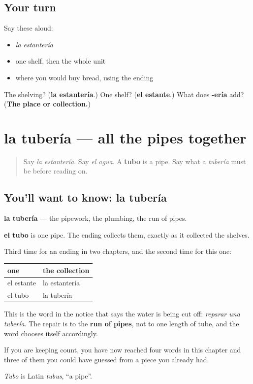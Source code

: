 \subsection*{Your turn}
Say these aloud:

\begin{itemize}
\raggedright
  \item \emph{la estantería}
  \item one shelf, then the whole unit
  \item where you would buy bread, using the ending
\end{itemize}

\begin{tcolorbox}[breakable,colback=teal!4,colframe=teal!35!black,title={Before you move on}]
The shelving? (\textbf{la estantería}.) One shelf? (\textbf{el estante}.) What does \textbf{-ería} add? (\textbf{The place or collection.})
\end{tcolorbox}
\section[la tubería]{la tubería — all the pipes together}

\label{lesson:ES-C432-tuberia}



\begin{quote}
Say \emph{la estantería}. Say \emph{el agua}. A \textbf{tubo} is a pipe. Say what a \emph{tubería} must be before reading on.
\end{quote}

\subsection*{You'll want to know: la tubería}
\textbf{la tubería} — the pipework, the plumbing, the run of pipes.

\textbf{el tubo} is one pipe. The ending collects them, exactly as it collected the shelves.

\begin{cousinweb}
Third time for an ending in two chapters, and the second time for this one:

\noindent
\begin{tabularx}{\linewidth}{@{}>{\raggedright\arraybackslash}X>{\raggedright\arraybackslash}X@{}}
\toprule
\textbf{one} & \textbf{the collection} \\
\midrule
el estante & la estantería \\
el tubo & la tubería \\
\bottomrule
\end{tabularx}

This is the word in the notice that says the water is being cut off: \emph{reparar una tubería}. The repair is to the \textbf{run of pipes}, not to one length of tube, and the word chooses itself accordingly.

If you are keeping count, you have now reached four words in this chapter and three of them you could have guessed from a piece you already had.

\emph{Tubo} is Latin \emph{tubus}, \textquotedblleft{}a pipe\textquotedblright{}.
\end{cousinweb}


